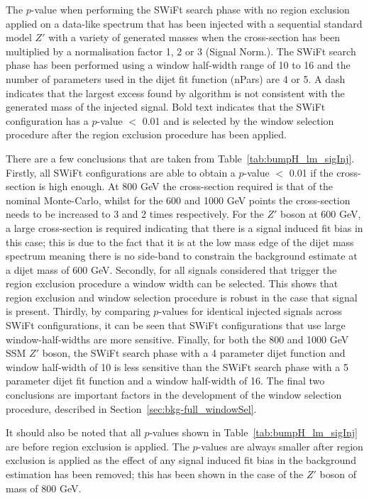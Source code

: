 \begin{table}[!ht]
\caption{\label{tab:bumpH_lm_sigInj}
  The  \bh{} \mbox{$p$-value} when performing the SWiFt search phase with no region exclusion applied
  on a data-like spectrum that has been injected with a sequential standard model $Z'$ with
  a variety of generated masses when the cross-section has been multiplied by a normalisation factor 1, 2 or 3 (Signal Norm.).
  The SWiFt search phase has been performed using a window half-width range of 10 to 16
  and the number of parameters used in the dijet fit function (nPars) are 4 or 5.
  A dash indicates that the largest excess found by \bh{} algorithm is not consistent with the generated mass of the injected signal.
  Bold text indicates that the SWiFt configuration has a \bh{} $p$-value $<$ 0.01
  and is selected by the window selection procedure after the region exclusion procedure has been applied. }
\end{table}

There are a few conclusions that are taken from Table~\ref{tab:bumpH_lm_sigInj}.
Firstly, all SWiFt configurations are able to obtain a \bh{} $p$-value $<$ 0.01 if the cross-section is high enough.
At 800 GeV the cross-section required is that of the nominal Monte-Carlo, whilst for the 600 and 1000 GeV points
the cross-section needs to be increased to 3 and 2 times respectively.
For the $Z'$ boson at 600 GeV, a large cross-section is required indicating that
there is a signal induced fit bias in this case;
this is due to the fact that it is at the low mass edge of the
dijet mass spectrum meaning there is no side-band to constrain the background estimate at a dijet mass of 600 GeV.
Secondly, for all signals considered that trigger the region exclusion procedure a window width can be selected.
This shows that region exclusion and window selection procedure is robust in the case that signal is present.
Thirdly, by comparing \bh{} $p$-values for identical injected signals across SWiFt configurations,
it can be seen that SWiFt configurations that use large window-half-widths are more sensitive.
Finally, for both the 800 and 1000 GeV SSM $Z'$ boson,
the SWiFt search phase with a 4 parameter dijet function and window half-width of 10 is less sensitive than the
SWiFt search phase with a 5 parameter dijet fit function and a window half-width of 16.
The final two conclusions are important factors in the development of the window selection procedure, described in Section~\ref{sec:bkg-full_windowSel}.

It should also be noted that all \bh{} $p$-values shown in Table~\ref{tab:bumpH_lm_sigInj} are before region exclusion is applied.
The \bh{} \mbox{$p$-value}s are always smaller after region exclusion is applied
as the effect of any signal induced fit bias in the background estimation has been removed;
this has been shown in the case of the $Z'$ boson of mass of 800 GeV.

